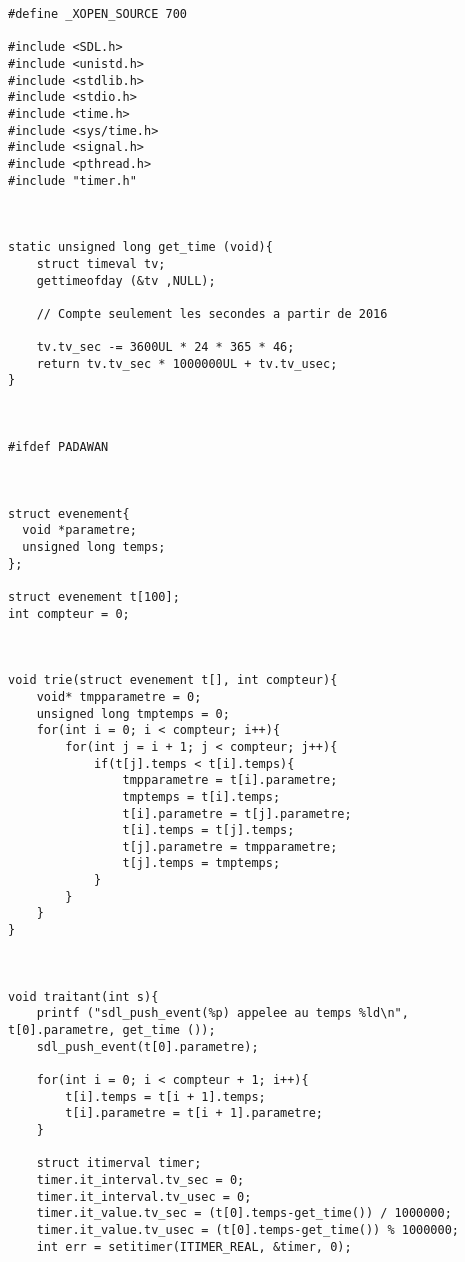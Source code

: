 \documentclass{report}
\begin{document}
  \begin{lstlisting}
#define _XOPEN_SOURCE 700

#include <SDL.h>
#include <unistd.h>
#include <stdlib.h>
#include <stdio.h>
#include <time.h>
#include <sys/time.h>
#include <signal.h>
#include <pthread.h>
#include "timer.h"



static unsigned long get_time (void){
	struct timeval tv;
	gettimeofday (&tv ,NULL);

	// Compte seulement les secondes a partir de 2016
  
	tv.tv_sec -= 3600UL * 24 * 365 * 46;
	return tv.tv_sec * 1000000UL + tv.tv_usec;
}



#ifdef PADAWAN



struct evenement{
  void *parametre;
  unsigned long temps;
};

struct evenement t[100];
int compteur = 0;



void trie(struct evenement t[], int compteur){
  	void* tmpparametre = 0; 
  	unsigned long tmptemps = 0;
  	for(int i = 0; i < compteur; i++){                                                                          
      	for(int j = i + 1; j < compteur; j++){                                                 
         	if(t[j].temps < t[i].temps){
            	tmpparametre = t[i].parametre;
                tmptemps = t[i].temps;
                t[i].parametre = t[j].parametre;
                t[i].temps = t[j].temps;
                t[j].parametre = tmpparametre;
                t[j].temps = tmptemps;
			}                                                                  
        }                                                                      
    } 
}



void traitant(int s){
  	printf ("sdl_push_event(%p) appelee au temps %ld\n", t[0].parametre, get_time ());
  	sdl_push_event(t[0].parametre);
  	
    for(int i = 0; i < compteur + 1; i++){
    	t[i].temps = t[i + 1].temps;
    	t[i].parametre = t[i + 1].parametre;
  	}
  
  	struct itimerval timer;
  	timer.it_interval.tv_sec = 0;
  	timer.it_interval.tv_usec = 0;
  	timer.it_value.tv_sec = (t[0].temps-get_time()) / 1000000; 
  	timer.it_value.tv_usec = (t[0].temps-get_time()) % 1000000;  
  	int err = setitimer(ITIMER_REAL, &timer, 0);
  	

\end{lstlisting}
\end{document}
